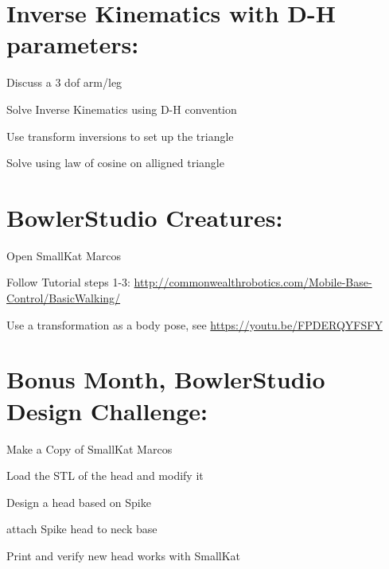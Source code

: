 \documentclass{article}
\begin{document}
\section{Inverse Kinematics with D-H parameters:}
\begin{todolist}
	\item Discuss a 3 dof arm/leg
	\item Solve Inverse Kinematics using D-H convention
	\item Use transform inversions to set up the triangle 
	\item Solve using law of cosine on alligned triangle
\end{todolist}


\section{BowlerStudio Creatures:}
\begin{todolist}
	\item Open SmallKat Marcos
	\item Follow Tutorial steps 1-3:  \url{http://commonwealthrobotics.com/Mobile-Base-Control/BasicWalking/}
	\item Use a transformation as a body pose, see  \url{https://youtu.be/FPDERQYFSFY}
\end{todolist}


\section{Bonus Month, BowlerStudio Design Challenge:}
\begin{todolist}
	\item Make a Copy of SmallKat Marcos
	\item Load the STL of the head and modify it
	\item Design a head based on Spike
	\item attach Spike head to neck base
	\item Print and verify new head works with SmallKat
\end{todolist}
\end{document}
